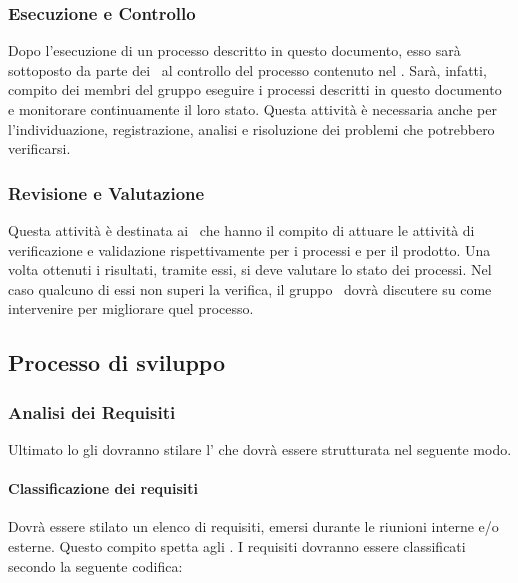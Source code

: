 \subsubsection{Esecuzione e Controllo}
Dopo l'esecuzione di un processo descritto in questo documento, esso sarà sottoposto da parte dei \VerP\ al controllo del processo contenuto nel \PdQ. Sarà, infatti, compito dei membri del gruppo eseguire i processi descritti in questo documento e monitorare continuamente il loro stato. Questa attività è necessaria anche per l'individuazione, registrazione, analisi e risoluzione dei problemi che potrebbero verificarsi.

\subsubsection{Revisione e Valutazione}
Questa attività è destinata ai \Ver\ che hanno il compito di attuare le attività di verificazione e validazione rispettivamente per i processi e per il prodotto. Una volta ottenuti i risultati, tramite essi, si deve valutare lo stato dei processi. Nel caso qualcuno di essi non superi la verifica, il gruppo \gruppo\ dovrà discutere su come intervenire per migliorare quel processo.

\subsection{Processo di sviluppo}
\subsubsection{Analisi dei Requisiti}
Ultimato lo \textit{\SdF} gli \textit{\AnP} dovranno stilare l'\textit{\AdR} che dovrà 	essere strutturata nel seguente modo.
\paragraph{Classificazione dei requisiti}
Dovrà essere stilato un elenco di requisiti, emersi durante le riunioni interne
e/o esterne. Questo compito spetta agli \textit{\AnP}. I requisiti dovranno
essere classificati secondo la seguente codifica:

